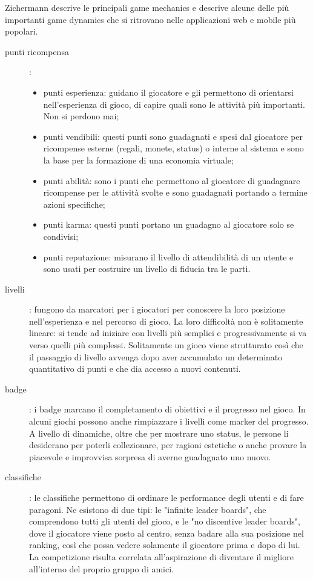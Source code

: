 Zichermann descrive le principali game mechanics e descrive alcune delle più importanti game dynamics che si ritrovano nelle applicazioni web e mobile più popolari.

\begin{description}
    \item[punti ricompensa]:
    \begin{itemize}
        \item punti esperienza: guidano il giocatore e gli permettono di orientarsi nell'esperienza di gioco, di capire quali sono le attività più importanti. Non si perdono mai;
        \item punti vendibili: questi punti sono guadagnati e spesi dal giocatore per ricompense esterne (regali, monete, status) o interne al sistema e sono la base per la formazione di una economia virtuale;
        \item punti abilità: sono i punti che permettono al giocatore di guadagnare ricompense per le attività svolte e sono guadagnati portando a termine azioni specifiche;
        \item punti karma: questi punti portano un guadagno al giocatore solo se condivisi;
        \item punti reputazione: misurano il livello di attendibilità di un utente e sono usati per costruire un livello di fiducia tra le parti.
    \end{itemize} 
    \item[livelli]: fungono da marcatori per i giocatori per conoscere la loro posizione nell'esperienza e nel percorso di gioco. La loro difficoltà non è solitamente lineare: si tende ad iniziare con livelli più semplici e progressivamente si va verso quelli più complessi. Solitamente un gioco viene strutturato così che il passaggio di livello avvenga dopo aver accumulato un determinato quantitativo di punti e che dia accesso a nuovi contenuti.
    \item[badge]: i badge marcano il completamento di obiettivi e il progresso nel gioco. In alcuni giochi possono anche rimpiazzare i livelli come marker del progresso. A livello di dinamiche, oltre che per mostrare uno status, le persone li desiderano per poterli collezionare, per ragioni estetiche o anche provare la piacevole e improvvisa sorpresa di averne guadagnato uno nuovo.
    \item[classifiche]: le classifiche permettono di ordinare le performance degli utenti e di fare paragoni. Ne esistono di due tipi: le "infinite leader boards", che comprendono tutti gli utenti del gioco, e le "no discentive leader boards", dove il giocatore viene posto al centro, senza badare alla sua posizione nel ranking, così che possa vedere solamente il giocatore prima e dopo di lui. La competizione risulta correlata all'aspirazione di diventare il migliore all'interno del proprio gruppo di amici.

\end{description}

